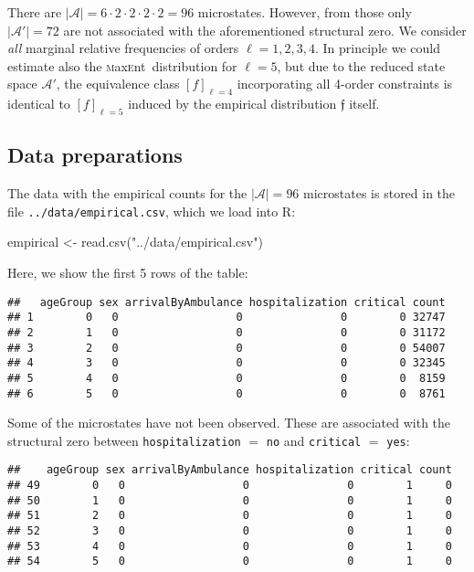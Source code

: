 \documentclass[
]{article}
\newenvironment{Shaded}{\begin{snugshade}}{\end{snugshade}}
\newcommand{\FunctionTok}[1]{\textcolor[rgb]{0.00,0.00,0.00}{#1}}
\newcommand{\NormalTok}[1]{#1}
\newcommand{\OtherTok}[1]{\textcolor[rgb]{0.56,0.35,0.01}{#1}}
\newcommand{\StringTok}[1]{\textcolor[rgb]{0.31,0.60,0.02}{#1}}
\newcommand{\abs}[1]{\left\vert#1\right\vert} %
\newcommand{\prob}[1]{\mathfrak{#1}}
\newcommand{\dimstatespace}{{\abs{\mathcal{A}}}}
\newcommand{\maxent}{\textsc{m}ax\textsc{e}nt~}
\begin{document}
There are \(\dimstatespace = 6\cdot 2\cdot 2\cdot 2 \cdot 2 = 96\)
microstates. However, from those only \(\vert\mathcal A'\vert=72\) are
not associated with the aforementioned structural zero. We consider
\emph{all} marginal relative frequencies of orders \(\ell = 1,2,3,4\).
In principle we could estimate also the \maxent distribution for
\(\ell = 5\), but due to the reduced state space \(\mathcal A'\), the
equivalence class \([f]_{\ell = 4}\) incorporating all 4-order
constraints is identical to \([f]_{\ell = 5}\) induced by the empirical
distribution \(\prob f\) itself.

\hypertarget{data-preparations}{%
\subsection{Data preparations}\label{data-preparations}}

The data with the empirical counts for the \(\dimstatespace = 96\)
microstates is stored in the file \texttt{../data/empirical.csv}, which
we load into R:

\begin{Shaded}
\begin{Highlighting}[]
\NormalTok{empirical }\OtherTok{\textless{}{-}} \FunctionTok{read.csv}\NormalTok{(}\StringTok{"../data/empirical.csv"}\NormalTok{)}
\end{Highlighting}
\end{Shaded}

Here, we show the first 5 rows of the table:

\begin{verbatim}
##   ageGroup sex arrivalByAmbulance hospitalization critical count
## 1        0   0                  0               0        0 32747
## 2        1   0                  0               0        0 31172
## 3        2   0                  0               0        0 54007
## 4        3   0                  0               0        0 32345
## 5        4   0                  0               0        0  8159
## 6        5   0                  0               0        0  8761
\end{verbatim}

Some of the microstates have not been observed. These are associated
with the structural zero between \texttt{hospitalization} \(=\)
\texttt{no} and \texttt{critical} \(=\) \texttt{yes}:

\begin{verbatim}
##    ageGroup sex arrivalByAmbulance hospitalization critical count
## 49        0   0                  0               0        1     0
## 50        1   0                  0               0        1     0
## 51        2   0                  0               0        1     0
## 52        3   0                  0               0        1     0
## 53        4   0                  0               0        1     0
## 54        5   0                  0               0        1     0
\end{verbatim}
\end{document}
